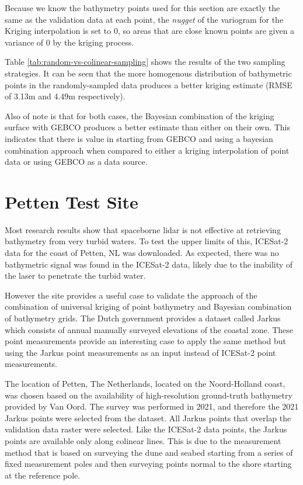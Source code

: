 Because we know the bathymetry points used for this section are exactly the same as the validation data at each point, the \emph{nugget} of the variogram for the Kriging interpolation is set to $0$, so areas that are close known points are given a variance of $0$ by the kriging process. 


Table \ref{tab:random-vs-colinear-sampling} shows the results of the two sampling strategies. It can be seen that the more homogenous distribution of bathymetric points in the randomly-sampled data produces a better kriging estimate (RMSE of 3.13m and 4.49m respectively). 

Also of note is that for both cases, the Bayesian combination of the kriging surface with GEBCO produces a better estimate than either on their own. This indicates that there is value in starting from GEBCO and using a bayesian combination approach when compared to either a kriging interpolation of point data or using GEBCO as a data source.


\section{Petten Test Site}
Most research results show that spaceborne lidar is not effective at retrieving bathymetry from very turbid waters. To test the upper limits of this, ICESat-2 data for the coast of Petten, NL was downloaded. As expected, there was no bathymetric signal was found in the ICESat-2 data, likely due to the inability of the laser to penetrate the turbid water. 

However the site provides a useful case to validate the approach of the combination of universal kriging of point bathymetry and Bayesian combination of bathymetry grids. The Dutch government provides a dataset called Jarkus which consists of annual manually surveyed elevations of the coastal zone. These point measurements provide an interesting case to apply the same method but using the Jarkus point measurements as an input instead of ICESat-2 point measurements.

The location of Petten, The Netherlands, located on the Noord-Holland coast, was chosen based on the availability of high-resolution ground-truth bathymetry provided by Van Oord. The survey was performed in 2021, and therefore the 2021 Jarkus points were selected from the dataset. All Jarkus points that overlap the validation data raster were selected. Like the ICESat-2 data points, the Jarkus points are available only along colinear lines. This is due to the measurement method that is based on surveying the dune and seabed starting from a series of fixed measurement poles and then surveying points normal to the shore starting at the reference pole. 


